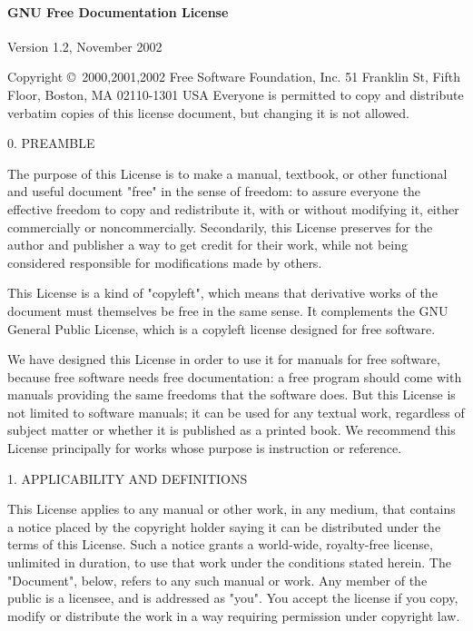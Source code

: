 \documentclass[letterpaper]{book}
\begin{document}
\pagebreak
{}
\paragraph*{\bf GNU Free Documentation License}

Version 1.2, November 2002

  Copyright \copyright\ 2000,2001,2002  Free Software Foundation, Inc.
  51 Franklin St, Fifth Floor, Boston, MA  02110-1301  USA
  Everyone is permitted to copy and distribute verbatim copies
  of this license document, but changing it is not allowed.

0. PREAMBLE

The purpose of this License is to make a manual, textbook, or other
functional and useful document "free" in the sense of freedom: to
assure everyone the effective freedom to copy and redistribute it,
with or without modifying it, either commercially or noncommercially.
Secondarily, this License preserves for the author and publisher a way
to get credit for their work, while not being considered responsible
for modifications made by others.

This License is a kind of "copyleft", which means that derivative
works of the document must themselves be free in the same sense. It
complements the GNU General Public License, which is a copyleft
license designed for free software.

We have designed this License in order to use it for manuals for free
software, because free software needs free documentation: a free
program should come with manuals providing the same freedoms that the
software does. But this License is not limited to software manuals; it
can be used for any textual work, regardless of subject matter or
whether it is published as a printed book. We recommend this License
principally for works whose purpose is instruction or reference.

1. APPLICABILITY AND DEFINITIONS

This License applies to any manual or other work, in any medium, that
contains a notice placed by the copyright holder saying it can be
distributed under the terms of this License. Such a notice grants a
world-wide, royalty-free license, unlimited in duration, to use that
work under the conditions stated herein. The "Document", below, refers
to any such manual or work. Any member of the public is a licensee,
and is addressed as "you". You accept the license if you copy, modify
or distribute the work in a way requiring permission under copyright
law.
\end{document}
